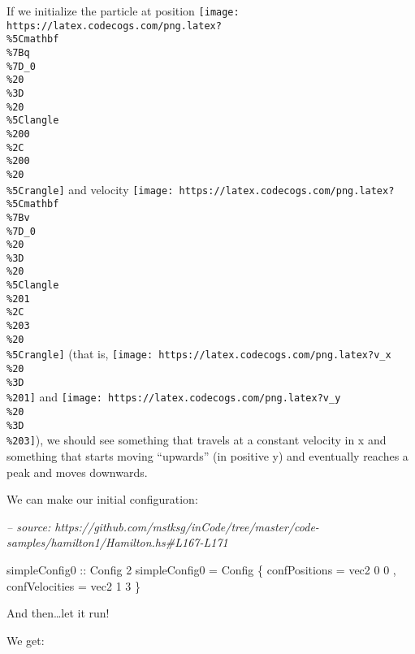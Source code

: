 \documentclass[]{article}
\newenvironment{Shaded}{}{}
\newcommand{\CommentTok}[1]{\textcolor[rgb]{0.38,0.63,0.69}{\textit{#1}}}
\newcommand{\DataTypeTok}[1]{\textcolor[rgb]{0.56,0.13,0.00}{#1}}
\newcommand{\DecValTok}[1]{\textcolor[rgb]{0.25,0.63,0.44}{#1}}
\newcommand{\FloatTok}[1]{\textcolor[rgb]{0.25,0.63,0.44}{#1}}
\newcommand{\FunctionTok}[1]{\textcolor[rgb]{0.02,0.16,0.49}{#1}}
\newcommand{\NormalTok}[1]{#1}
\newcommand{\OtherTok}[1]{\textcolor[rgb]{0.00,0.44,0.13}{#1}}
\begin{document}
If we initialize the particle at position
\texttt{[image: https://latex.codecogs.com/png.latex?\\\%5Cmathbf\\\%7Bq\\\%7D\_0\\\%20\\\%3D\\\%20\\\%5Clangle\\\%200\\\%2C\\\%200\\\%20\\\%5Crangle]}
and velocity
\texttt{[image: https://latex.codecogs.com/png.latex?\\\%5Cmathbf\\\%7Bv\\\%7D\_0\\\%20\\\%3D\\\%20\\\%5Clangle\\\%201\\\%2C\\\%203\\\%20\\\%5Crangle]}
(that is,
\texttt{[image: https://latex.codecogs.com/png.latex?v\_x\\\%20\\\%3D\\\%201]} and
\texttt{[image: https://latex.codecogs.com/png.latex?v\_y\\\%20\\\%3D\\\%203]}), we
should see something that travels at a constant velocity in x and something that
starts moving ``upwards'' (in positive y) and eventually reaches a peak and
moves downwards.

We can make our initial configuration:

\begin{Shaded}
\begin{Highlighting}[]
\CommentTok{-- source: https://github.com/mstksg/inCode/tree/master/code-samples/hamilton1/Hamilton.hs#L167-L171}

\OtherTok{simpleConfig0 ::} \DataTypeTok{Config} \DecValTok{2}
\NormalTok{simpleConfig0 }\FunctionTok{=} \DataTypeTok{Config}
\NormalTok{    \{ confPositions  }\FunctionTok{=}\NormalTok{ vec2 }\DecValTok{0} \DecValTok{0}
\NormalTok{    , confVelocities }\FunctionTok{=}\NormalTok{ vec2 }\DecValTok{1} \DecValTok{3}
\NormalTok{    \}}
\end{Highlighting}
\end{Shaded}

And then\ldots{}let it run!

\begin{Shaded}
\end{Shaded}

We get:
\end{document}
